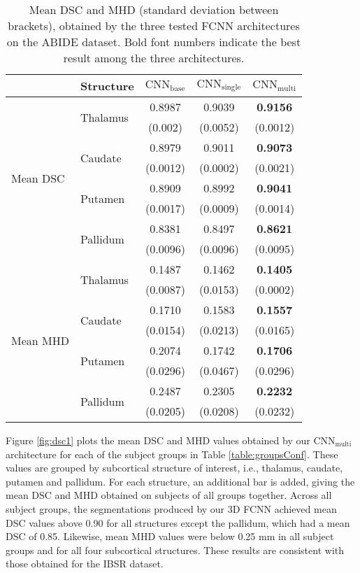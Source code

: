 \documentclass[twoside,fleqn,espcrc2]{elsarticle}
\newcommand{\CNNbase}{\mr{CNN}_\mr{base}}
\newcommand{\CNNsingle}{\mr{CNN}_\mr{single}}
\newcommand{\CNNmulti}{\mr{CNN}_\mr{multi}}
\newcommand{\mr}[1]{\mathrm{#1}}
\begin{document}
\begin{table}[h!]
\begin{center}
\begin{footnotesize}
\renewcommand{\arraystretch}{1.2}
\begin{tabular}{llccc}
\toprule
    & \textbf{Structure} & $\bm{\CNNbase}$ & $\bm{\CNNsingle}$ & $\bm{\CNNmulti}$  \\ 
    \midrule
\multirow{8}{*}{Mean DSC} & \multirow{2}{*}{Thalamus} & 0.8987 & 0.9039 & \textbf{0.9156} \\
&  & (0.002) & (0.0052) & (0.0012) \\
\cmidrule{2-5}
& \multirow{2}{*}{Caudate} & 0.8979 & 0.9011 & \textbf{0.9073} \\
&  & (0.0012) & (0.0002) & (0.0021)\\
\cmidrule{2-5}
& \multirow{2}{*}{Putamen} & 0.8909 & 0.8992 & \textbf{0.9041} \\
&  & (0.0017) & (0.0009) & (0.0014) \\
\cmidrule{2-5}
& \multirow{2}{*}{Pallidum} & 0.8381 & 0.8497 & \textbf{0.8621} \\
&  & (0.0096) & (0.0096) & (0.0095) \\
\midrule
\multirow{8}{*}{Mean MHD} & \multirow{2}{*}{Thalamus} & 0.1487 & 0.1462 & \textbf{0.1405} \\
&  & (0.0087) & (0.0153) & (0.0002) \\
\cmidrule{2-5}
& \multirow{2}{*}{Caudate} & 0.1710 & 0.1583 & \textbf{0.1557} \\
&  & (0.0154) & (0.0213) & (0.0165) \\
\cmidrule{2-5}
& \multirow{2}{*}{Putamen} & 0.2074 & 0.1742 & \textbf{0.1706} \\
&  & (0.0296) & (0.0467) & (0.0296) \\
\cmidrule{2-5}
& \multirow{2}{*}{Pallidum} & 0.2487 & 0.2305 & \textbf{0.2232} \\
&  & (0.0205) & (0.0208) & (0.0232) \\
\bottomrule
\end{tabular}
\end{footnotesize}
\caption{Mean DSC and MHD (standard deviation between brackets), obtained by the three tested FCNN architectures on the ABIDE dataset. Bold font numbers indicate the best result among the three architectures.}
\label{table:ABIDEThreeConf}
\end{center}
\end{table}


Figure \ref{fig:dsc1} plots the mean DSC and MHD values obtained by our $\CNNmulti$ architecture for each of the subject groups in Table \ref{table:groupsConf}. These values are grouped by subcortical structure of interest, i.e., thalamus, caudate, putamen and pallidum. For each structure, an additional bar is added, giving the mean DSC and MHD obtained on subjects of all groups together. Across all subject groups, the segmentations produced by our 3D FCNN achieved mean DSC values above 0.90 for all structures except the pallidum, which had a mean DSC of 0.85. Likewise, mean MHD values were below 0.25 mm in all subject groups and for all four subcortical structures. These results are consistent with those obtained for the IBSR dataset. 
\end{document}
